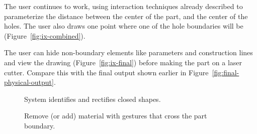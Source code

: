\documentclass[12pt]{article}
\begin{document}
The user continues to work, using interaction techniques already
described to parameterize the distance between the center of the part,
and the center of the holes. The user also draws one point where one
of the hole boundaries will be (Figure~\ref{fig:ix-combined}).

The user can hide non-boundary elements like parameters and
construction lines and view the drawing (Figure~\ref{fig:ix-final})
before making the part on a laser cutter. Compare this with the final
output shown earlier in Figure~\ref{fig:final-physical-output}.

\newpage
{}
\twocolumn

\begin{figure}[] 
\centering
{} 
\caption{System identifies and rectifies closed shapes.}
\label{fig:ix-draw-bounds}
\end{figure}

\begin{figure}[] 
\centering
{} 
\caption{Remove (or add) material with gestures that cross the part
  boundary.}
\label{fig:ix-remove-from-edge}
\end{figure}
\end{document}
